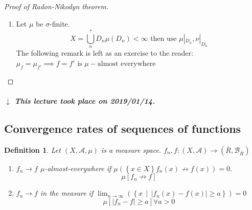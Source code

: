 \documentclass[a4paper]{article}
\makeatletter
\newcounter{lecref}[section]
\numberwithin{lecref}{section}
\theoremstyle{break}
\newtheorem{definition}[lecref]{Definition}
\newcommand{\dateref}[1]{%
  \begin{mdframed}[backgroundcolor=gray!10,innerbottommargin=0pt,innertopmargin=0pt]
    \paragraph{\textit{$\downarrow$ This lecture took place on #1.}}%
  \end{mdframed}%
}
\newcommand{\Abs}[1]{\left|#1\right|}
\newcommand{\Set}[1]{\left\{#1\right\}}
\newcommand{\SetDef}[2]{\left\{#1\,\mid\,#2\right\}}
\def\mov@rlay#1#2{\leavevmode\vtop{%
   \baselineskip\z@skip \lineskiplimit-\maxdimen
   \ialign{\hfil$\m@th#1##$\hfil\cr#2\crcr}}}
\newcommand{\charfusion}[3][\mathord]{
    #1{\ifx#1\mathop\vphantom{#2}\fi
        \mathpalette\mov@rlay{#2\cr#3}
      }
    \ifx#1\mathop\expandafter\displaylimits\fi}
\newcommand{\bigcupdot}{\charfusion[\mathop]{\bigcup}{\cdot}}
\providecommand*{\dotcup}{%
  \mathbin{%
    \mathpalette\@dotcup{}%
  }%
}
\newcommand*{\@dotcup}[2]{%
  \ooalign{%
    $\m@th#1\cup$\cr
    \hidewidth$\m@th#1\cdot$\hidewidth
  }%
}
\makeatother
\begin{document}
\begin{proof}[Proof of Radon-Nikodyn theorem]
\begin{enumerate}
      There exists some sequence $(B_n)$ of $A$ with $B_n \subset B_{n+1}$. $\nu(B_n) < \infty$. $\nu(B_n) \nearrow \beta$.
      Let $E = \bigcup_n B_n, F = E^C$.
      If $A \subset F, A \in \mathcal A$, we assume $\nu(A) < \infty \implies \nu(B_n \dotcup A) < \infty$
      \[ \implies \mu(B_n \cup A) \leq \beta \implies \mu(B_n) + \mu(A) \leq \beta \qquad n \to \infty \]
      \[ \mu(A) = 0 \implies \nu(A) = 0 \]
      Either $\mu(A) = \nu(A) = 0$ or $\mu(A) > 0, \nu(A) = \infty$.
      \[ E = \bigcupdot_n E_n \qquad E_1 = B_1 \qquad E_n = B_n \setminus B_{n-1} \qquad (n \geq 2) \]
      \[ \nu|_{E_n} \eqqcolon \nu_n \qquad \mu|_{E_n} \eqqcolon \mu_n \qquad \text{ are finite measures} \]
      \[ \nu_n(A) = \nu(E_n \cap A) \qquad \nu_n \ll \mu_n \]
      \[ \exists \tilde f_n: \nu_n(A) = \int_A \tilde f_n \, d\mu_n = \int_A \underbrace{\tilde f_n \cdot \mathbf 1_{E_n}}_{f_n} \, d\mu \forall A \in \mathcal A \]
      \[ f = \sum_{n = 1}^\infty f_n + \infty \cdot \mathbf 1_F \]
      \[ \nu(A) = \nu(A \cap E) + \nu(A \cap F) = \int_{A \cap E} f \, d\mu + \int_{A \cap F} \infty \, d\mu = \int_A f \, d\mu \forall A \in \mathcal A \]
    \item Let $\mu$ be $\sigma$-finite.
      \[ X = \bigcup_n^+ D_n \mu(D_n) < \infty \text{ then use } \mu|_{D_n}, \nu|_{D_n} \]
      The following remark is left as an exercise to the reader:
      $\mu_f = \mu_{f'} \implies f = f' \text{ is } \mu-\text{almost everywhere}$
  \end{enumerate}
\end{proof}

\dateref{2019/01/14}

\subsection{Convergence rates of sequences of functions}

\begin{definition}
  Let $(X, \mathcal A, \mu)$ is a measure space. $f_n, f: (X, \mathcal A) \to (\overline R, \mathcal B_{\overline R})$
  \begin{enumerate}
    \item $f_n \to f$ $\mu$-almost-everywhere if $\mu(\Set{x \in X}{f_n(x) \not\to f(x)}) = 0$.
      \[ \mu[f_n \not\to f] \]
    \item $f_n \to f$ in the measure if $\lim_{n \to \infty}\left(\SetDef{x}{\Abs{f_n(x) - f(x)} \geq a}\right) = 0$
      \[ \mu[\Abs{f_n - f} \geq a] \forall a > 0 \]
  \end{enumerate}
\end{definition}
\end{document}
